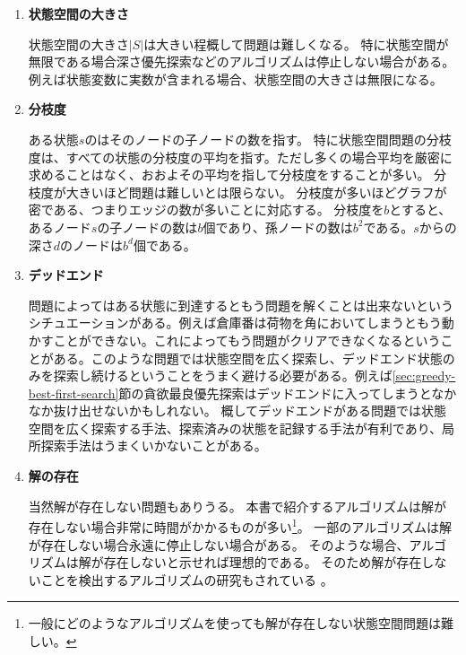 \begin{enumerate}
\item {\bf 状態空間の大きさ}

状態空間の大きさ$|S|$は大きい程概して問題は難しくなる。
特に状態空間が無限である場合深さ優先探索などのアルゴリズムは停止しない場合がある。
例えば状態変数に実数が含まれる場合、状態空間の大きさは無限になる。

\item {\bf 分枝度}

ある状態$s$のはそのノードの子ノードの数を指す。
特に状態空間問題の分枝度は、すべての状態の分枝度の平均を指す。ただし多くの場合平均を厳密に求めることはなく、おおよその平均を指して分枝度をすることが多い。
分枝度が大きいほど問題は難しいとは限らない。
分枝度が多いほどグラフが密である、つまりエッジの数が多いことに対応する。
分枝度を$b$とすると、あるノード$s$の子ノードの数は$b$個であり、孫ノードの数は$b^2$である。$s$からの深さ$d$のノードは$b^d$個である。

\item {\bf デッドエンド}

問題によってはある状態に到達するともう問題を解くことは出来ないというシチュエーションがある。例えば倉庫番は荷物を角においてしまうともう動かすことができない。これによってもう問題がクリアできなくなるということがある。このような問題では状態空間を広く探索し、デッドエンド状態のみを探索し続けるということをうまく避ける必要がある。例えば\ref{sec:greedy-best-first-search}節の貪欲最良優先探索はデッドエンドに入ってしまうとなかなか抜け出せないかもしれない。
概してデッドエンドがある問題では状態空間を広く探索する手法、探索済みの状態を記録する手法が有利であり、局所探索手法はうまくいかないことがある。

\item {\bf 解の存在}

当然解が存在しない問題もありうる。
本書で紹介するアルゴリズムは解が存在しない場合非常に時間がかかるものが多い\footnote{一般にどのようなアルゴリズムを使っても解が存在しない状態空間問題は難しい。}。
一部のアルゴリズムは解が存在しない場合永遠に停止しない場合がある。
そのような場合、アルゴリズムは解が存在しないと示せれば理想的である。
そのため解が存在しないことを検出するアルゴリズムの研究もされている \cite{backstrom2013fast,hoffmann2014distance}。

\end{enumerate}

